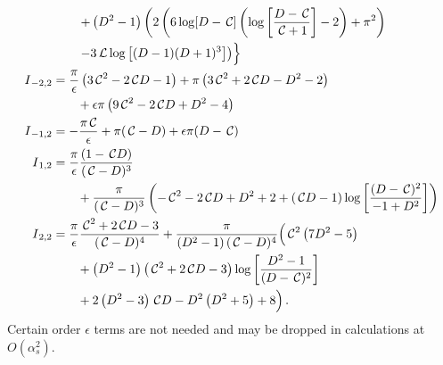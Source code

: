 \documentclass[prd,preprintnumbers,nofootinbib,superscriptaddress,onecolumn,preprint]{revtex4-1}
\newcommand\3[1]{\boldsymbol{#1}}
\newcommand{\parz}[1]{\ensuremath{\left(#1\right)}}
\newcommand{\order}[1]{\ensuremath{O\parz{#1}}}
\newcommand{\cosfun}{\ensuremath{\mathcal{ \, C}}}
\newcommand{\llun}{\ensuremath{ \mathcal{\, L}}}
\begin{document}
\begin{align}
&{} \qquad \left.+\left(D^2-1\right) \left(2 \left(6 \log [D-\cosfun] \left(\log \left[\frac{D-\cosfun}{\cosfun+1}\right]-2\right)+\pi ^2\right) \right. \right. \nonumber \\
&{} \qquad \left. -3 \llun \log \left[(D-1) (D+1)^3\right]\right) \Bigr\} \\
I{}_{-2,2} &{}= \frac{\pi}{\epsilon } \left( 3 \cosfun^2 - 2 \cosfun D - 1\right) + \pi \left( 3 \cosfun^2 + 2 \cosfun D -D^2 -2  \right) \nonumber \\ 
               &{} \qquad +   \epsilon \pi \left( 9 \cosfun^2 - 2 \cosfun D+ D^2-4 \right)  \\
I{}_{-1,2} &{}=-\frac{\pi  \cosfun}{\epsilon } + \pi ( \cosfun- D) + \epsilon \pi (D- \cosfun) \\
I{}_{1,2}  &{}= \frac{\pi}{\epsilon} \frac{(1 - \cosfun D )}{ (\cosfun-D)^3} \nonumber \\ 
               &{} \qquad + \frac{\pi}{(\cosfun-D)^3}  \left(-\cosfun^2-2 \cosfun D +D^2+2 + (\cosfun D-1) \log \left[\frac{(D-\cosfun)^2}{-1+D^2}\right] \right)  \\
I{}_{2,2}  &{} = \frac{\pi}{\epsilon} \frac{\cosfun^2+2 \cosfun D-3}{ (\cosfun-D)^4} + \frac{\pi}{\left(D^2-1\right) (\cosfun-D)^4}  \Bigr( \cosfun^2 \left(7 D^2-5\right) \nonumber \\ 
               &{} \qquad +  \left(D^2-1\right) \left(\cosfun^2  + 2 \cosfun D-3\right) \log \left[\frac{D^2-1}{(D-\cosfun)^2}\right]  \nonumber \\
               &{} \qquad +  2 \left(D^2-3\right) \cosfun D-D^2 \left(D^2+5\right)+8 \Bigl) \, .
\end{align}
Certain order $\epsilon$ terms are not needed and may be dropped in calculations at $\order{\alpha_s^2}$. 


\end{document}
